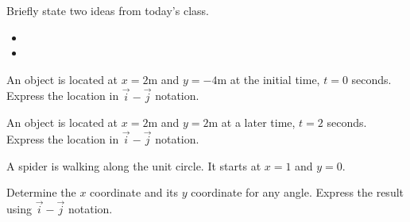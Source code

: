 \postClass

\begin{problem}
\item Briefly state two ideas from today's class.
  \begin{itemize}
  \item 
  \item 
  \end{itemize}
\item 
  \begin{subproblem}
    \item
  \end{subproblem}
\end{problem}



\begin{problem}
\item An object is located at $x=2$m and $y=-4$m at the initial time,
  $t=0$ seconds. Express the location in $\vec{i}-\vec{j}$ notation.
  \vfill
\item An object is located at $x=2$m and $y=2$m at a later time,
  $t=2$ seconds. Express the location in $\vec{i}-\vec{j}$ notation.
  \vfill
\item A spider is walking along the unit circle. It starts at $x=1$
  and $y=0$.

  \scalebox{0.35}{}

  Determine the $x$ coordinate and its $y$ coordinate for any
  angle. Express the result using $\vec{i}-\vec{j}$ notation.

  \vfill
\end{problem}



